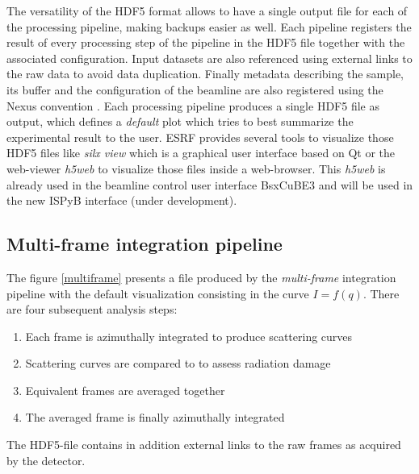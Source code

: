 \documentclass[preprint]{iucr}              %
\begin{document}
The versatility of the HDF5 format allows to have a single output file for each of the processing pipeline, making backups easier as well. 
Each pipeline registers the result of every processing step of the pipeline in the HDF5 file together with the associated configuration.
Input datasets are also referenced using external links to the raw data to avoid data duplication. 
Finally metadata describing the sample, its buffer and the configuration of the beamline are also registered using the Nexus convention \cite{nexus}.
Each processing pipeline produces a single HDF5 file as output, which defines a \textit{default} plot which tries to best summarize the experimental result to the user.
ESRF provides several tools to visualize those HDF5 files like \textit{silx view} \cite{silx} which is a graphical user interface based on Qt \cite{pyqt} or the web-viewer \textit{h5web} \cite{h5web} to visualize those files inside a web-browser.
This \textit{h5web} is already used in the beamline control user interface BsxCuBE3 \cite{bm29_2022} and will be used in the new ISPyB interface (under development).

\subsection{Multi-frame integration pipeline}

The figure \ref{multiframe} presents a file produced by the \textit{multi-frame} integration pipeline with the default visualization consisting in the curve $I = f(q)$. 
There are four subsequent analysis steps:
\begin{enumerate}
\item Each frame is azimuthally integrated to produce scattering curves
\item Scattering curves are compared to to assess radiation damage
\item Equivalent frames are averaged together
\item The averaged frame is finally azimuthally integrated
\end{enumerate}
The HDF5-file contains in addition external links to the raw frames as acquired by the detector.
\end{document}
